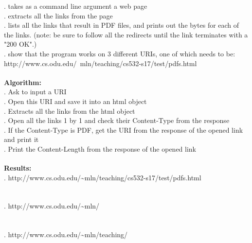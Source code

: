 \documentclass{article}
\begin{document}
		. takes as a command line argument a web page\\
		. extracts all the links from the page\\
		. lists all the links that result in PDF files, and prints out the bytes for each of the links.  (note: be sure to follow all the redirects until the link terminates with a "200 OK".)\\
		. show that the program works on 3 different URIs, one of which needs to be:\\
		\indent http://www.cs.odu.edu/~mln/teaching/cs532-s17/test/pdfs.html\\\\
		\textbf{Algorithm:}\\
		. Ask to input a URI\\
		. Open this URI and save it into an html object\\
		. Extracts all the links from the html object\\
		. Open all the links 1 by 1 and check their Content-Type from the response\\
		. If the Content-Type is PDF, get the URI from the response of the opened link and print it\\
		. Print the Content-Length from the response of the opened link\\\\
		\textbf{Results:}\\
		. http://www.cs.odu.edu/\~{}mln/teaching/cs532-s17/test/pdfs.html\\
		\\\\
		. http://www.cs.odu.edu/\~{}mln/\\
		\\\\
		. http://www.cs.odu.edu/\~{}mln/teaching/\\
\end{document}
